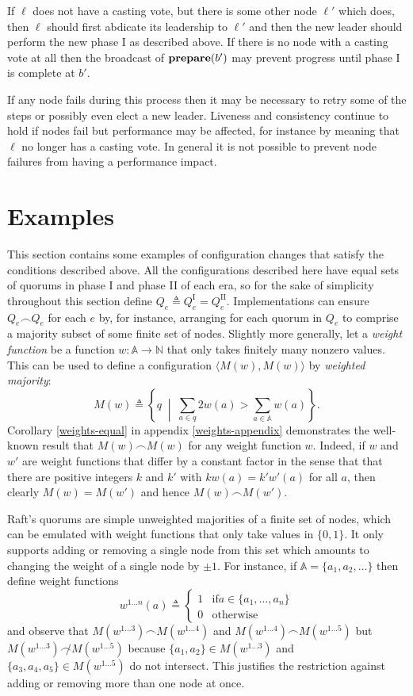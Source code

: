 \documentclass[journal]{IEEEtran}
\begin{document}
If $\ell$ does not have a casting vote, but there is some other node $\ell'$
which does, then $\ell$ should first abdicate its leadership to $\ell'$ and
then the new leader should perform the new phase I as described above. If there
is no node with a casting vote at all then the broadcast of $\mathbf{prepare}(b')$ may
prevent progress until phase I is complete at $b'$.

If any node fails during this process then it may be necessary to retry some of
the steps or possibly even elect a new leader. Liveness and consistency
continue to hold if nodes fail but performance may be affected, for instance by
meaning that $\ell$ no longer has a casting vote. In general it is not possible
to prevent node failures from having a performance impact.

\section{Examples}\label{types-of-configuration-change}

This section contains some examples of configuration changes that satisfy the
conditions described above.  All the configurations described here have equal
sets of quorums in phase I and phase II of each era, so for the sake of
simplicity throughout this section define ${Q_e \triangleq Q^\textrm{I}_e =
Q^\textrm{II}_e}$.  Implementations can ensure $Q_e \frown Q_e$ for each $e$
by, for instance, arranging for each quorum in $Q_e$ to comprise a majority
subset of some finite set of nodes. Slightly more generally, let a
\textit{weight function} be a function $w : \mathbb A \to \mathbb N$ that only
takes finitely many nonzero values. This can be used to define a configuration
$\langle M(w), M(w) \rangle$ by \textit{weighted majority}: \[M(w) \triangleq
  \left\{ q \;\middle|\; \sum_{a \in q} 2 w(a) > \sum_{a \in \mathbb A} w(a)
\right\}.\] Corollary \ref{weights-equal} in appendix \ref{weights-appendix}
demonstrates the well-known result that $M(w) \frown M(w)$ for any weight
function $w$.  Indeed, if $w$ and $w'$ are weight functions that differ by a
constant factor in the sense that that there are positive integers $k$ and $k'$
with $k w(a) = k' w'(a)$ for all $a$, then clearly ${M(w) = M(w')}$ and hence
$M(w) \frown M(w')$.

\def\wl#1{w^{1 \ldots #1}}
\def\Mwl#1{M(\wl{#1})}

Raft's quorums are simple unweighted majorities of a finite set of nodes, which
can be emulated with weight functions that only take values in $\{0, 1\}$. It
only supports adding or removing a single node from this set which amounts to
changing the weight of a single node by $\pm 1$. For instance, if $\mathbb A =
\{ a_1, a_2, \ldots \}$ then define weight functions \[\wl{n}(a) \triangleq
\begin{cases} 1 & \mathrm{if } a \in \{a_1, \ldots, a_n\} \\ 0 &
\mathrm{otherwise}\end{cases}\] and observe that ${\Mwl{3} \frown \Mwl{4}}$ and
${\Mwl{4} \frown \Mwl{5}}$ but ${\Mwl{3} \not\frown \Mwl{5}}$ because $\{a_1,
a_2\} \in \Mwl{3}$ and $\{a_3, a_4, a_5\} \in \Mwl{5}$ do not intersect. This
justifies the restriction against adding or removing more than one node at
once.
\end{document}
